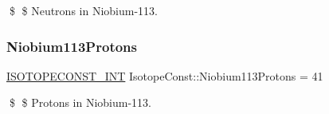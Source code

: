 \$ \$ Neutrons in Niobium-\/113. \mbox{\label{group___isotope_const-_niobium-_nb113_gabbebea2fefdadbde0b1c22a75418cbb8}} 
\subsubsection{\texorpdfstring{Niobium113\+Protons}{Niobium113Protons}}
{\footnotesize\ttfamily \mbox{\hyperlink{group___isotope_const-_macros_ga5f18360b3e99483a35c32d789e62621c}{I\+S\+O\+T\+O\+P\+E\+C\+O\+N\+S\+T\+\_\+\+I\+NT}} Isotope\+Const\+::\+Niobium113\+Protons = 41}

\$ \$ Protons in Niobium-\/113. 